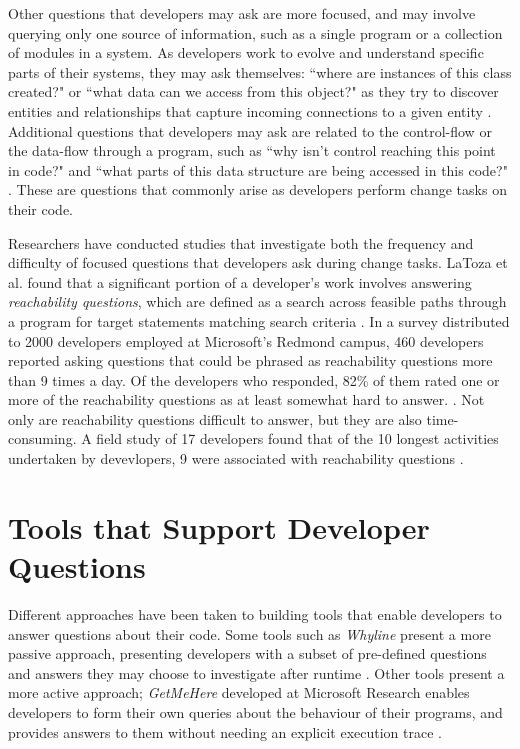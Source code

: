 \par Other questions that developers may ask are more focused, and may involve
querying only one source of information, such as a single program or a
collection of modules in a system.
As developers work to evolve and understand specific parts of their systems,
they may ask themselves: ``where are instances of this class created?" or
``what data can we access from this object?" as they try to discover entities
and relationships that capture incoming connections to a given entity
\cite{sillito-2006-questions-during-task}.
Additional questions that developers may ask are related to 
the control-flow or the data-flow through a program, such as 
``why isn't control reaching this point in code?" and 
``what parts of this data structure are being accessed in this code?" 
\cite{sillito-2006-questions-during-task}.
These are questions that commonly arise as developers perform change tasks
on their code.

\par Researchers have conducted studies that investigate both the 
frequency and difficulty of focused questions that developers ask during 
change tasks.
LaToza et al. found that a significant portion of a developer's work involves 
answering \emph{reachability questions}, which are defined as a search across 
feasible paths through a program for target statements matching search criteria 
\cite{latoza-2010-reach}.
In a survey distributed to 2000 developers employed at Microsoft's Redmond
campus, 460 developers reported asking questions that could be phrased as 
reachability questions more than 9 times a day.
Of the developers who responded, 82\% of them rated one or more of the
reachability questions as at least somewhat hard to answer.
\cite{latoza-2010-reach}.
Not only are reachability questions difficult to answer, but they are also
time-consuming.
A field study of 17 developers found that of the 10 longest activities
undertaken by devevlopers, 9 were associated with reachability questions
\cite{latoza-2010-reach}.


\section{Tools that Support Developer Questions}
\label{sec:ToolsSupportDeveloperQuestions}

\noindent Different approaches have been taken to building tools 
that enable developers to answer questions about their code.
Some tools such as \emph{Whyline} present a more passive approach,
presenting developers with a subset of pre-defined questions and answers 
they may choose to investigate after runtime \cite{ko-2004-whyline}.
Other tools present a more active approach; \emph{GetMeHere} developed
at Microsoft Research enables developers to form their own queries about
the behaviour of their programs, and provides answers to them without needing
an explicit execution trace \cite{barnett-2014-get}.

